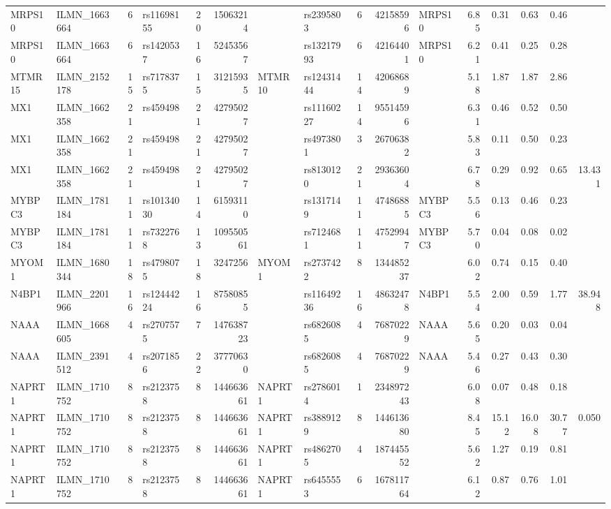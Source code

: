 \documentclass{article}
\begin{document}
\begin{landscape}
{\begin{ThreePartTable}
\begin{longtable}{|llr|lrrl|lrrl|rrrr|r|}
MRPS10 & ILMN\_1663664 & 6 & rs11698155 & 20 & 15063214 &  & rs2395803 & 6 & 42158596 & MRPS10 & 6.85 & 0.31 & 0.63 & 0.46 &  \\
MRPS10 & ILMN\_1663664 & 6 & rs1420537 & 16 & 52453567 &  & rs13217993 & 6 & 42164401 & MRPS10 & 6.21 & 0.41 & 0.25 & 0.28 &  \\
MTMR15 & ILMN\_2152178 & 15 & rs7178375 & 15 & 31215935 & MTMR10 & rs12431444 & 14 & 42068689 &  & 5.18 & 1.87 & 1.87 & 2.86 &  \\
MX1 & ILMN\_1662358 & 21 & rs459498 & 21 & 42795027 &  & rs11160227 & 14 & 95514596 &  & 6.31 & 0.46 & 0.52 & 0.50 &  \\
MX1 & ILMN\_1662358 & 21 & rs459498 & 21 & 42795027 &  & rs4973801 & 3 & 26706382 &  & 5.83 & 0.11 & 0.50 & 0.23 &  \\
MX1 & ILMN\_1662358 & 21 & rs459498 & 21 & 42795027 &  & rs8130120 & 21 & 29363604 &  & 6.78 & 0.29 & 0.92 & 0.65 & 13.431 \\
MYBPC3 & ILMN\_1781184 & 11 & rs10134030 & 14 & 61593110 &  & rs1317149 & 11 & 47486885 & MYBPC3 & 5.56 & 0.13 & 0.46 & 0.23 &  \\
MYBPC3 & ILMN\_1781184 & 11 & rs7322768 & 13 & 109550561 &  & rs7124681 & 11 & 47529947 & MYBPC3 & 5.70 & 0.04 & 0.08 & 0.02 &  \\
MYOM1 & ILMN\_1680344 & 18 & rs4798075 & 18 & 3247256 & MYOM1 & rs2737422 & 8 & 134485237 &  & 6.02 & 0.74 & 0.15 & 0.40 &  \\
N4BP1 & ILMN\_2201966 & 16 & rs12444224 & 16 & 87580855 &  & rs11649236 & 16 & 48632478 & N4BP1 & 5.54 & 2.00 & 0.59 & 1.77 & 38.948 \\
NAAA & ILMN\_1668605 & 4 & rs2707575 & 7 & 147638723 &  & rs6826085 & 4 & 76870229 & NAAA & 5.65 & 0.20 & 0.03 & 0.04 &  \\
NAAA & ILMN\_2391512 & 4 & rs2071856 & 22 & 37770630 &  & rs6826085 & 4 & 76870229 & NAAA & 5.46 & 0.27 & 0.43 & 0.30 &  \\
NAPRT1 & ILMN\_1710752 & 8 & rs2123758 & 8 & 144663661 & NAPRT1 & rs2786014 & 1 & 234897243 &  & 6.08 & 0.07 & 0.48 & 0.18 &  \\
NAPRT1 & ILMN\_1710752 & 8 & rs2123758 & 8 & 144663661 & NAPRT1 & rs3889129 & 8 & 144613680 &  & 8.45 & 15.12 & 16.08 & 30.77 & 0.050 \\
NAPRT1 & ILMN\_1710752 & 8 & rs2123758 & 8 & 144663661 & NAPRT1 & rs4862705 & 4 & 187445552 &  & 5.62 & 1.27 & 0.19 & 0.81 &  \\
NAPRT1 & ILMN\_1710752 & 8 & rs2123758 & 8 & 144663661 & NAPRT1 & rs6455553 & 6 & 167811764 &  & 6.12 & 0.87 & 0.76 & 1.01 &  \\

\end{longtable}
\end{ThreePartTable}}
\end{landscape}
\end{document}
